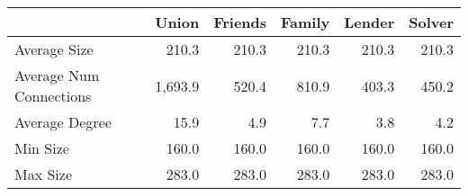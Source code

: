\begin{tabular}{lrrrrr}
\toprule
                         &     Union &   Friends &   Family &   Lender &   Solver \\
\midrule
 Average Size            &     210.3 &     210.3 &    210.3 &    210.3 &    210.3 \\
 Average Num Connections & 1,693.9   &     520.4 &    810.9 &    403.3 &    450.2 \\
 Average Degree          &      15.9 &       4.9 &      7.7 &      3.8 &      4.2 \\
 Min Size                &     160.0 &     160.0 &    160.0 &    160.0 &    160.0 \\
 Max Size                &     283.0 &     283.0 &    283.0 &    283.0 &    283.0 \\
\bottomrule
\end{tabular}